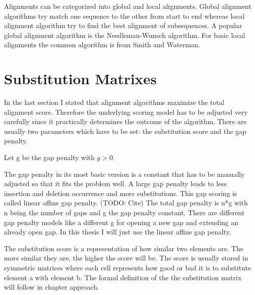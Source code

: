 Alignments can be categorized into global and local alignments. Global alignment algorithms try match one sequence to the other from start to end whereas local alignment algorithm try to find the best alignment of subsequences. 
A popular global alignment algorithm is the Needleman-Wunsch algorithm\cite{needleman1970}. For basic local alignments the common algorithm is from Smith and Waterman\cite{waterman1981}.

\section{Substitution Matrixes}
\label{sec:foundationsubstitutionmatrix}
In the last section I stated that alignment algorithms maximize the total alignment score. Therefore the underlying scoring model has to be adjusted very carefully since it practically determines the outcome of the algorithm.
There are usually two parameters which have to be set: the substitution score and the gap penalty. 

\begin{definition}
	\item Let g be the gap penalty with $g>0$.
	\label{def:gappenalty}
\end{definition}

The gap penalty in its most basic version is a constant that has to be manually adjusted so that it fits the problem well. 
A large gap penalty leads to less insertion and deletion occurrence and more substitutions.
This gap scoring is called linear affine gap penalty. (TODO: Cite)
The total gap penalty is n*g with n being the number of gaps and g the gap penalty constant. 
There are different gap penalty models like a different g for opening a new gap and extending an already open gap. 
In this thesis I will just use the linear affine gap penalty. 

The substitution score is a representation of how similar two elements are. The more similar they are, the higher the score will be.
The score is usually stored in symmetric matrices where each cell represents how good or bad it is to substitute element a with element b. 
The formal definition of the the substitution matrix will follow in chapter approach.
\begin{figure}
	\label{fig:submatexample}
\end{figure}
